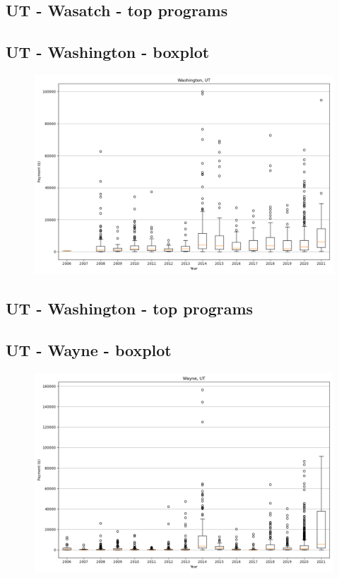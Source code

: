 \subsection*{UT - Wasatch - top programs}

\newpage
\subsection*{UT - Washington - boxplot}
\begin{figure}[h]
\centering
\includegraphics[width=7in]{../output/boxplots/counties/Washington-UT_boxplot.png}
\end{figure}


\subsection*{UT - Washington - top programs}

\newpage
\subsection*{UT - Wayne - boxplot}
\begin{figure}[h]
\centering
\includegraphics[width=7in]{../output/boxplots/counties/Wayne-UT_boxplot.png}
\end{figure}


